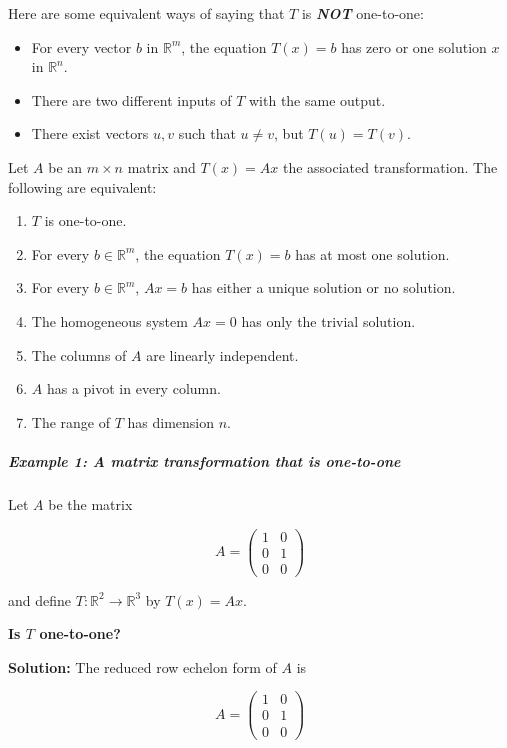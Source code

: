 \documentclass[a4paper,12pt]{article}
\begin{document}
Here are some equivalent ways of saying that $T$ is \textbf{\textit{NOT}} one-to-one:
\begin{itemize}
    \item For every vector $b$ in \(\mathbb{R}^m\), the equation $T(x) = b$ has zero or one solution $x$ in \(\mathbb{R}^n\).
    \item There are two different inputs of $T$ with the same output.
    \item There exist vectors $u,v$ such that $u \neq v$, but $T(u)=T(v)$.
\end{itemize}
\begin{tcolorbox}[title=Theorem (One-to-one transformations),colframe=blue!70!black, colback=blue!5!white]
Let \( A \) be an \( m \times n \) matrix and \( T(x) = Ax \) the associated transformation. The following are equivalent:

\begin{enumerate}
    \item \( T \) is one-to-one.
    \item For every \( b \in \mathbb{R}^m \), the equation \( T(x) = b \) has at most one solution.
    \item For every \( b \in \mathbb{R}^m \), \( Ax = b \) has either a unique solution or no solution.
    \item The homogeneous system \( Ax = 0 \) has only the trivial solution.
    \item The columns of \( A \) are linearly independent.
    \item \( A \) has a pivot in every column.
    \item The range of \( T \) has dimension \( n \).
\end{enumerate}
\end{tcolorbox}
\subparagraph{Example 1: A matrix transformation that is one-to-one} Let \( A \) be the matrix

\[
A = \begin{pmatrix} 
1 & 0 \\
0 & 1 \\
0 & 0
\end{pmatrix}
\]

and define \( T: \mathbb{R}^2 \to \mathbb{R}^3 \) by \( T(x) = Ax \).

\textbf{Is \( T \) one-to-one?}

\textbf{Solution:}  
The reduced row echelon form of \( A \) is

\[
A = \begin{pmatrix} 
1 & 0 \\
0 & 1 \\
0 & 0
\end{pmatrix}
\]
\end{document}
